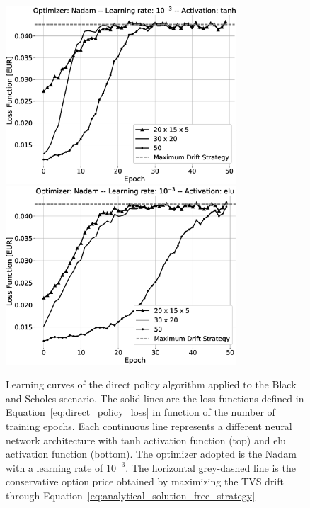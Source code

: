 \documentclass[runningheads]{m2ef}
\newcommand{\change}[1]{{\color{red} {#1}}}%
\begin{document}
 \begin{figure}[h!]
	\centering
	\includegraphics[width=3.4in]{BS_fine_tuning_Nadam_tanh_grey.eps}
	\includegraphics[width=3.4in]{BS_fine_tuning_Nadam_elu_grey.eps}
	\caption{Learning curves of the direct policy algorithm applied to the Black and Scholes \change{scenario}. The solid lines are the loss functions defined in Equation~\eqref{eq:direct_policy_loss} in function of the number of training epochs. Each continuous line represents a different neural network architecture with tanh activation function (top) and elu activation function (bottom). The optimizer adopted is the Nadam with a learning rate of $10^{-3}$. The horizontal grey-dashed line is the conservative option price obtained by maximizing the TVS drift through Equation~\eqref{eq:analytical_solution_free_strategy}}
	\label{fig:result_bs_nadam}
\end{figure}  
\end{document}

